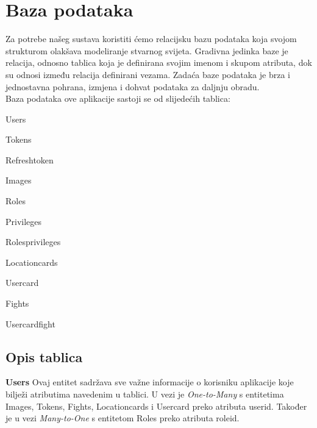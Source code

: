 	
				
		\section{Baza podataka}
			
			
		\textnormal{Za potrebe našeg sustava koristiti ćemo relacijsku bazu podataka koja svojom strukturom 	olakšava modeliranje stvarnog svijeta. Gradivna jedinka baze je relacija, odnosno tablica koja je definirana svojim imenom i skupom atributa, dok su odnosi između relacija definirani vezama. Zadaća baze podataka je brza i jednostavna pohrana, izmjena i dohvat podataka za daljnju obradu.\\Baza podataka ove aplikacije sastoji se od slijedećih tablica:}
		
		\begin{packed_item}
			\item \textnormal{Users}
			\item \textnormal{Tokens}
			\item \textnormal{Refresh\textunderscore token}
			\item \textnormal{Images}
			\item \textnormal{Roles}
			\item \textnormal{Privileges}
			\item \textnormal{Roles\textunderscore privileges}
			\item \textnormal{Location\textunderscore cards}
			\item \textnormal{User\textunderscore card}
			\item \textnormal{Fights}
			\item \textnormal{User\textunderscore  card\textunderscore fight}
		\end{packed_item}
		
			\subsection{Opis tablica}
			

				\textnormal{\textbf{Users} \quad Ovaj entitet sadržava sve važne informacije o korisniku aplikacije koje bilježi atributima navedenim u tablici. U vezi je \textit{One-to-Many} s entitetima Images, Tokens, Fights, Location\textunderscore cards i User\textunderscore card preko atributa user\textunderscore id. Također je u vezi \textit{Many-to-One} s entitetom Roles preko atributa role\textunderscore id.}
				
